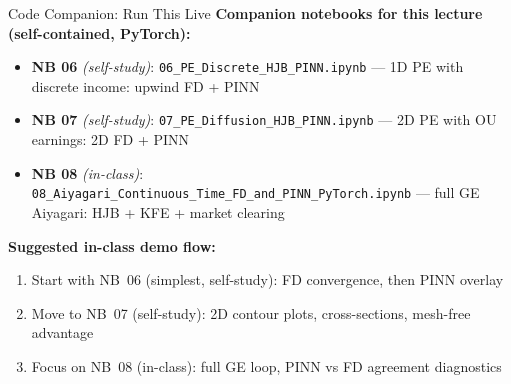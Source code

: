 \documentclass[aspectratio=169,11pt]{beamer}
\begin{document}
\begin{frame}{Code Companion: Run This Live}
\footnotesize
\textbf{Companion notebooks for this lecture (self-contained, PyTorch):}
\begin{itemize}\itemsep2pt
    \item \textbf{NB 06} \textit{(self-study)}: \texttt{06\_PE\_Discrete\_HJB\_PINN.ipynb} --- 1D PE with discrete income: upwind FD + PINN
    \item \textbf{NB 07} \textit{(self-study)}: \texttt{07\_PE\_Diffusion\_HJB\_PINN.ipynb} --- 2D PE with OU earnings: 2D FD + PINN
    \item \textbf{NB 08} \textit{(in-class)}: \texttt{08\_Aiyagari\_Continuous\_Time\_FD\_and\_PINN\_PyTorch.ipynb} --- full GE Aiyagari: HJB + KFE + market clearing
\end{itemize}

\vspace{0.2em}
\textbf{Suggested in-class demo flow:}
\begin{enumerate}\itemsep1pt
    \item Start with NB~06 (simplest, self-study): FD convergence, then PINN overlay
    \item Move to NB~07 (self-study): 2D contour plots, cross-sections, mesh-free advantage
    \item Focus on NB~08 (in-class): full GE loop, PINN vs FD agreement diagnostics
\end{enumerate}
\end{frame}
\end{document}
